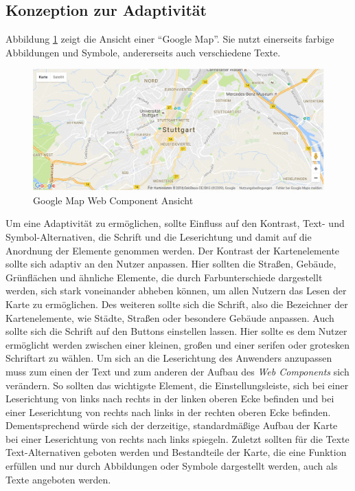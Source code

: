 \documentclass[12pt, paper=a4, bibtotoc, toc=listof, headsepline=true, numbers=endperiod]{scrreprt}
\begin{document}
	\subsection{Konzeption zur Adaptivität}
	\label{ref:konVonAda}
	Abbildung \ref{img:gmap} zeigt die Ansicht einer \enquote{Google Map}. Sie nutzt einerseits farbige Abbildungen und Symbole, andererseits auch verschiedene Texte.
	\begin{figure}[H]
		\centering
		\includegraphics[width=\textwidth,height=\textheight,keepaspectratio]{gmap.png}
		\caption[Google Map Web Component]{Google Map Web Component Ansicht \cite{gooMapGit}}
		\label{img:gmap}
	\end{figure}\noindent
	Um eine Adaptivität zu ermöglichen, sollte Einfluss auf den Kontrast, Text- und Symbol-Alternativen, die Schrift und die Leserichtung und damit auf die Anordnung der Elemente genommen werden. Der Kontrast der Kartenelemente sollte sich adaptiv an den Nutzer anpassen. Hier sollten die Straßen, Gebäude, Grünflächen und ähnliche Elemente, die durch Farbunterschiede dargestellt werden, sich stark voneinander abheben können, um allen Nutzern das Lesen der Karte zu ermöglichen. Des weiteren sollte sich die Schrift, also die Bezeichner der Kartenelemente, wie Städte, Straßen oder besondere Gebäude anpassen. Auch sollte sich die Schrift auf den Buttons einstellen lassen. Hier sollte es dem Nutzer ermöglicht werden zwischen einer kleinen, großen und einer serifen oder grotesken Schriftart zu wählen. Um sich an die Leserichtung des Anwenders anzupassen muss zum einen der Text und zum anderen der Aufbau des \emph{Web Components} sich verändern. So sollten das wichtigste Element, die Einstellungsleiste, sich bei einer Leserichtung von links nach rechts in der linken oberen Ecke befinden und bei einer Leserichtung von rechts nach links in der rechten oberen Ecke befinden. Dementsprechend würde sich der derzeitige, standardmäßige Aufbau der Karte bei einer Leserichtung von rechts nach links spiegeln. Zuletzt sollten für die Texte Text-Alternativen geboten werden und Bestandteile der Karte, die eine Funktion erfüllen und nur durch Abbildungen oder Symbole dargestellt werden, auch als Texte angeboten werden. 
\end{document}
